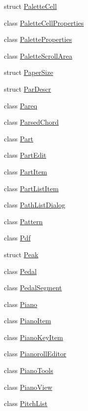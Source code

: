 \begin{DoxyCompactItemize}
\item 
struct \hyperlink{struct_ms_1_1_palette_cell}{Palette\+Cell}
\item 
class \hyperlink{class_ms_1_1_palette_cell_properties}{Palette\+Cell\+Properties}
\item 
class \hyperlink{class_ms_1_1_palette_properties}{Palette\+Properties}
\item 
class \hyperlink{class_ms_1_1_palette_scroll_area}{Palette\+Scroll\+Area}
\item 
struct \hyperlink{struct_ms_1_1_paper_size}{Paper\+Size}
\item 
struct \hyperlink{struct_ms_1_1_par_descr}{Par\+Descr}
\item 
class \hyperlink{class_ms_1_1_pareq}{Pareq}
\item 
class \hyperlink{class_ms_1_1_parsed_chord}{Parsed\+Chord}
\item 
class \hyperlink{class_ms_1_1_part}{Part}
\item 
class \hyperlink{class_ms_1_1_part_edit}{Part\+Edit}
\item 
class \hyperlink{class_ms_1_1_part_item}{Part\+Item}
\item 
class \hyperlink{class_ms_1_1_part_list_item}{Part\+List\+Item}
\item 
class \hyperlink{class_ms_1_1_path_list_dialog}{Path\+List\+Dialog}
\item 
class \hyperlink{class_ms_1_1_pattern}{Pattern}
\item 
class \hyperlink{class_ms_1_1_pdf}{Pdf}
\item 
struct \hyperlink{struct_ms_1_1_peak}{Peak}
\item 
class \hyperlink{class_ms_1_1_pedal}{Pedal}
\item 
class \hyperlink{class_ms_1_1_pedal_segment}{Pedal\+Segment}
\item 
class \hyperlink{class_ms_1_1_piano}{Piano}
\item 
class \hyperlink{class_ms_1_1_piano_item}{Piano\+Item}
\item 
class \hyperlink{class_ms_1_1_piano_key_item}{Piano\+Key\+Item}
\item 
class \hyperlink{class_ms_1_1_pianoroll_editor}{Pianoroll\+Editor}
\item 
class \hyperlink{class_ms_1_1_piano_tools}{Piano\+Tools}
\item 
class \hyperlink{class_ms_1_1_piano_view}{Piano\+View}
\item 
class \hyperlink{class_ms_1_1_pitch_list}{Pitch\+List}
\item 

\end{DoxyCompactItemize}
